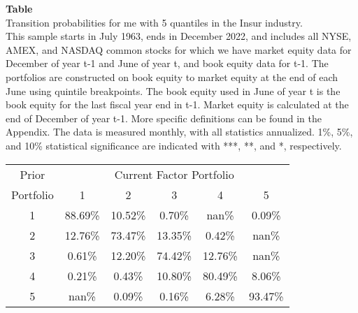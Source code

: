 \begin{table*}[ht!]
\raggedright
{}
\label{tab: transition_probs_me_Insur_with_5_quantiles}
\textbf{Table \thetable} \\
Transition probabilities for me with 5 quantiles in the Insur industry. \\
\hspace*{1em}This sample starts in July 1963, ends in December 2022, and includes all NYSE, AMEX, and NASDAQ common stocks for which we have market equity data for December of year t-1 and June of year t, and book equity data for t-1. The portfolios are constructed on book equity to market equity at the end of each June using quintile breakpoints.  The book equity used in June of year t is the book equity for the last fiscal year end in t-1.  Market equity is calculated at the end of December of year t-1.  More specific definitions can be found in the Appendix.  The data is measured monthly, with all statistics annualized.  1\%, 5\%, and 10\% statistical significance are indicated with ***, **, and *, respectively. \\
\vspace{0.5em}
\centering
\begin{adjustbox}{max width=\textwidth}
\begin{tabular}{@{}cccccc@{}}
\toprule
Prior & \multicolumn{5}{c}{Current Factor Portfolio} \\
Portfolio & 1 & 2 & 3 & 4 & 5 \\
\midrule
1 & 88.69\% & 10.52\% & 0.70\% & nan\% & 0.09\% \\
2 & 12.76\% & 73.47\% & 13.35\% & 0.42\% & nan\% \\
3 & 0.61\% & 12.20\% & 74.42\% & 12.76\% & nan\% \\
4 & 0.21\% & 0.43\% & 10.80\% & 80.49\% & 8.06\% \\
5 & nan\% & 0.09\% & 0.16\% & 6.28\% & 93.47\% \\
\bottomrule
\end{tabular}
\end{adjustbox}
\end{table*}